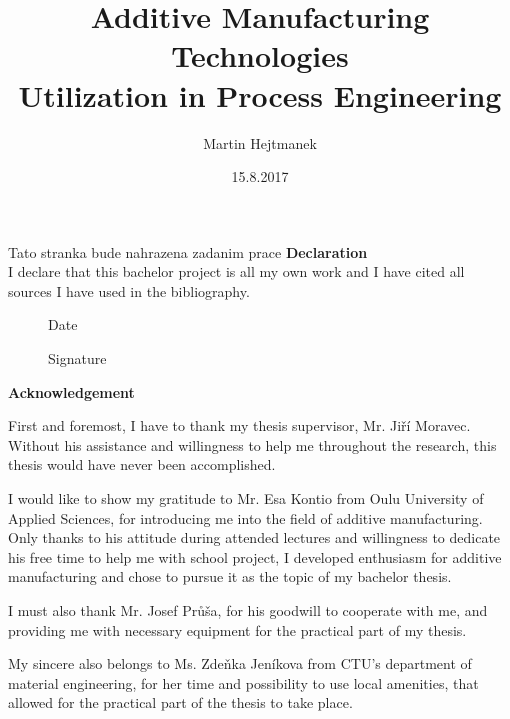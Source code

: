 \documentclass[a4paper, 11pt, reqno]{report}
\begin{document}
\hypersetup{hidelinks}
%
\begin{titlepage}
\title{Additive Manufacturing Technologies\\
Utilization in Process Engineering}
\author{Martin Hejtmanek}
\date{15.8.2017}
\maketitle
\end{titlepage}
%
%
%
Tato stranka bude nahrazena zadanim prace
%
%
%
\newpage
\vspace*{\fill}
\LARGE
\noindent
\textbf{Declaration}\\[10pt]
\normalsize
I declare that this bachelor project is all my own work and I have cited all sources I have used in the bibliography.
\\[10pt]

\begin{figure}[b!]
\begin{minipage}[t]{0.3\textwidth}
    Date
    \dotfill
\end{minipage}
\hfill
\begin{minipage}[t]{0.3\textwidth}
	Signature
	\dotfill
\end{minipage}
\end{figure}
%
%
%
\newpage
\vspace*{\fill}
\LARGE
\noindent
\textbf{Acknowledgement}\\[10pt]
\normalsize

	First and foremost, I have to thank my thesis supervisor, Mr. Jiří Moravec. Without his assistance and willingness to help me throughout the research, this thesis would have never been accomplished.
	

	I would like to show my gratitude to Mr. Esa Kontio from Oulu University of Applied Sciences, for introducing me into the field of additive manufacturing. Only thanks to his attitude during attended lectures and willingness to dedicate his free time to help me with school project, I developed enthusiasm for additive manufacturing and chose to pursue it as the topic of my bachelor thesis.
	
	
	I must also thank Mr. Josef Průša, for his goodwill to cooperate with me, and providing me with necessary equipment for the practical part of my thesis.


	My sincere also belongs to Ms. Zdeňka Jeníkova from CTU's department of material engineering, for her time and possibility to use local amenities, that allowed for the practical part of the thesis to take place.
	
\end{document}
